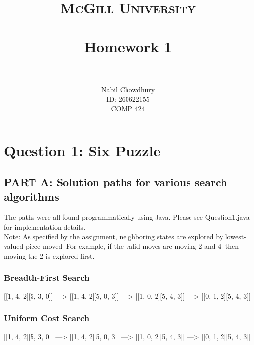 \documentclass[paper=a4, fontsize=11pt]{scrartcl} %
\title{	
\normalfont \normalsize 
\textsc{McGill University} \\ [25pt] %
\horrule{0.5pt} \\[0.4cm] %
\huge Homework 1 \\ %
\horrule{2pt} \\[0.5cm] %
}
\author{
    Nabil Chowdhury \\
    \small{ID: 260622155} \\
    \small{COMP 424} \\
} %
\numberwithin{equation}{section} %
\numberwithin{figure}{section} %
\numberwithin{table}{section} %
\begin{document}
\maketitle %
\section{Question 1: Six Puzzle}
\subsection{PART A: Solution paths for various search algorithms}
The paths were all found programmatically using Java. Please see Question1.java for implementation details. \\
Note: As specified by the assignment, neighboring states are explored by lowest-valued piece moved. For example, if the valid moves are moving 2 and 4, then moving the 2 is explored first.
\subsubsection{Breadth-First Search}
\begin{center}
[[1, 4, 2][5, 3, 0]] ---> [[1, 4, 2][5, 0, 3]] ---> [[1, 0, 2][5, 4, 3]] ---> [[0, 1, 2][5, 4, 3]]
\end{center}

\subsubsection{Uniform Cost Search}
\begin{center}
[[1, 4, 2][5, 3, 0]] ---> [[1, 4, 2][5, 0, 3]] ---> [[1, 0, 2][5, 4, 3]] ---> [[0, 1, 2][5, 4, 3]]
\end{center}
\end{document}
